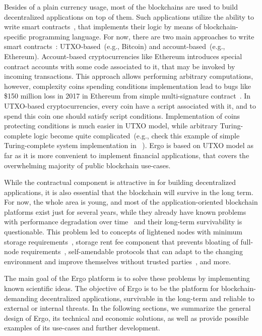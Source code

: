 Besides of a plain currency usage, most of the blockchains are used to build decentralized applications on top of them.
Such applications utilize the ability to write smart contracts~\cite{szabo1994smart}, that implements their logic
by means of blockchain-specific programming language.
For now, there are two main approaches to write smart contracts~\cite{zahnentferner2018chimeric}:
UTXO-based~(e.g., Bitcoin) and account-based~(e.g., Ethereum).
Account-based cryptocurrencies like Ethereum introduces special contract accounts with some code associated to it,
that may be invoked by incoming transactions.
This approach allows performing arbitrary computations, however, complexity coins spending conditions
implementation lead to bugs like \$150 million loss in 2017 in Ethereum from simple multi-signature contract~\cite{parityLock}.
In UTXO-based cryptocurrencies, every coin have a script associated with it, and to spend this coin one should
satisfy script conditions.
Implementation of coins protecting conditions is much easier in UTXO model,
while arbitrary Turing-complete logic become quite complicated~(e.g., check this example of
simple Turing-complete system implementation in \Ergo{}~\cite{chepurnoy2018self}).
Ergo is based on UTXO model as far as it is more convenient to implement financial applications, that
covers the overwhelming majority of public blockchain use-cases.

While the contractual component is attractive in for building decentralized applications,
it is also essential that the blockchain will survive in the long term.
For now, the whole area is young, and most of the application-oriented blockchain platforms exist just for several years,
while they already have known problems with performance degradation over time~\cite{???} and their long-term survivability is questionable.
This problem led to concepts of lightened nodes with minimum storage requirements~\cite{reyzin2017improving},
storage rent fee component that prevents bloating of full-node requirements~\cite{chepurnoy2018systematic},
self-amendable protocols that can adapt to the changing environment and improve themselves without
trusted parties~\cite{goodman2014tezos}, and more.

The main goal of the Ergo platform is to solve these problems by implementing known scientific ideas.
The objective of Ergo is to be the platform for blockchain-demanding decentralized
applications, survivable in the long-term and reliable to external or internal threats.
In the following sections, we summarize the general design of Ergo, its technical and economic solutions,
as well as provide possible examples of its use-cases and further development.